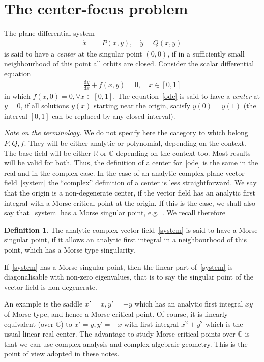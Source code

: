 \documentclass[11pt]{article}
\theoremstyle{definition}
\newtheorem{defi}[theo]{Definition}
\numberwithin{equation}{section}
\numberwithin{figure}{section}
\numberwithin{table}{section}
\newcommand*{\dd}{\mathrm{d}}
\newcommand*{\dx}{\dd x}
\newcommand*{\dy}{\dd y}
\newcommand*\R{\mathbb{R}}
\newcommand{\Cbb}{\mathbb C}
\let\oldforall\forall
\renewcommand*{\forall}{\mathrel{\oldforall}}
\begin{document}
\section{The center-focus problem}

The plane differential system
\begin{align}\label{system}
\dot{x} &= P(x,y), \quad
\dot{y}= Q(x,y)
\end{align}
is said to have a \emph{center} at the singular point $(0,0)$, if in a sufficiently small neighbourhood of this point all orbits are closed. Consider the scalar differential equation
\begin{align}\label{ode}
\frac{\dy}{\dx} + f(x,y) = 0,\quad x\in [0,1]
\end{align}
in which $f(x,0) =0, \forall x\in [0,1]$. The equation~\eqref{ode} is said to have a \emph{center} at $y=0$, if all solutions $y(x)$ starting near the origin, satisfy $y(0)=y(1)$ (the interval $[0,1]$ can be replaced by any closed interval).


\emph{Note on the terminology.} We do not specify here the category to which belong $P, Q, f$. They will be either analytic or polynomial, depending on the context. The base field will be either $\R$ or $\Cbb$ depending on the context too. Most results will be valid for both. Thus, the definition of a center for~\eqref{ode} is the same in the real and in the complex case. In the case of an analytic complex plane vector field~\eqref{system} the ``complex'' definition of a center is less straightforward. We say that the origin is a non-degenerate center, if the vector field has an analytic first integral with a Morse critical point at the origin. If this is the case, we shall also say that~\eqref{system} has a Morse singular point, e.g.~\cite{cerlin96,dul08}. We recall therefore
\begin{defi}
The analytic complex vector field~\eqref{system} is said to have a Morse singular point, if it allows an analytic first integral in a neighbourhood of this point, which has a Morse type singularity.
\end{defi}

If~\eqref{system} has a Morse singular point, then the linear part of~\eqref{system} is diagonalisable with non-zero eigenvalues, that is to say the singular point of the vector field is non-degenerate.

An example is the saddle $x'=x, y'=-y$ which has an analytic first integral $xy$ of Morse type, and hence a Morse critical point. Of course, it is linearly equivalent (over $\Cbb$) to $x'=y,y'=-x$ with first integral $x^2+y^2$ which is the usual linear real center. The advantage to study Morse critical points over $\Cbb$ is that we can use complex analysis and complex algebraic geometry. This is the point of view adopted in these notes.
\end{document}
